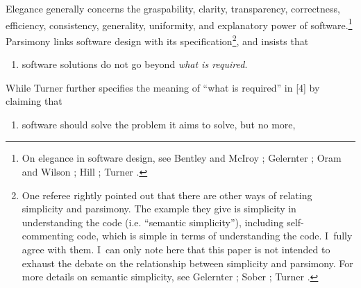 Elegance generally concerns the graspability, clarity, transparency, correctness, efficiency, consistency, generality, uniformity, and explanatory power of software.\footnote{On elegance in software design, see Bentley and McIroy 
\parencite*[][]{}; %
 Gelernter 
\parencite*[][]{gelernter_machine_1998}; %
 Oram and Wilson 
\parencite*[][]{}; %
 Hill 
\parencite*[][]{de_mol_elegance_2018}; %
 Turner 
\parencite*[][]{turner_computational_2018}.%
} Parsimony links software design with its specification\footnote{One referee rightly pointed out that there are other ways of relating simplicity and parsimony. The example they give is simplicity in understanding the code (i.e. ``semantic simplicity''), including self-commenting code, which is simple in terms of understanding the code. I~fully agree with them. I~can only note here that this paper is not intended to exhaust the debate on the relationship between simplicity and parsimony. For more details on semantic simplicity, see Gelernter 
\parencite*[][]{gelernter_machine_1998}; %
 Sober 
\parencite*[][]{sober_what_2002}; %
 Turner 
\parencite*[][]{turner_computational_2018}.%
}, and insists that



\setcounter{saveenum}{\value{enumi}}

\begin{enumerate}

\setcounter{enumi}{\value{saveenum}}

\item software solutions do not go beyond \textit{what is required}.

\end{enumerate}

While Turner further specifies the meaning of ``what is required'' in [4] by claiming that



\setcounter{saveenum}{\value{enumi}}

\begin{enumerate}

\setcounter{enumi}{\value{saveenum}}

\item software should solve the problem it aims to solve, but no more,

\end{enumerate}

